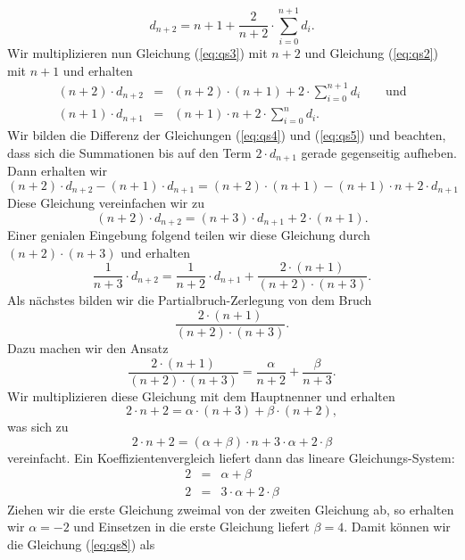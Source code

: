 \begin{equation}
  \label{eq:qs3}
   d_{n+2} = n+1 + \frac{2}{n+2} \cdot \sum_{i=0}^{n+1} d_i.  
\end{equation}
Wir multiplizieren nun Gleichung (\ref{eq:qs3}) mit $n+2$ und Gleichung (\ref{eq:qs2}) mit $n+1$ und
erhalten 
\begin{eqnarray}
  \label{eq:qs4}
 (n+2)\cdot d_{n+2} & = & (n+2)\cdot(n+1) + 2 \cdot \sum_{i=0}^{n+1} d_i \qquad \mbox{und} \\
  \label{eq:qs5}
 (n+1)\cdot d_{n+1} & = & (n+1)\cdot n + 2 \cdot \sum_{i=0}^n d_i.  
\end{eqnarray}
Wir bilden die Differenz der Gleichungen (\ref{eq:qs4}) und (\ref{eq:qs5}) und beachten,
dass sich die Summationen bis auf den Term $2\cdot d_{n+1}$ gerade gegenseitig aufheben.
Dann erhalten wir
\begin{equation}
  \label{eq:qs6}
 (n+2)\cdot d_{n+2} - (n+1)\cdot \displaystyle d_{n+1} = (n+2)\cdot(n+1) - (n+1)\cdot n+2 \cdot d_{n+1}
\end{equation}
Diese Gleichung vereinfachen wir zu
\begin{equation}
  \label{eq:qs7}
(n+2)\cdot d_{n+2} = (n+3)\cdot \displaystyle d_{n+1} + 2\cdot(n+1).  
\end{equation}
Einer genialen Eingebung folgend teilen wir diese Gleichung durch $(n+2) \cdot(n+3)$ und
erhalten 
\begin{equation}
  \label{eq:qs8}
 \frac{1}{n+3} \cdot d_{n+2} = \frac{1}{n+2}\cdot d_{n+1} + \frac{2\cdot(n+1)}{(n+2)\cdot(n+3)}.
\end{equation}
Als n\"achstes bilden wir die Partialbruch-Zerlegung von dem Bruch
\[ \frac{2\cdot(n+1)}{(n+2)\cdot(n+3)}. \] 
Dazu machen wir den Ansatz
\[ \frac{2\cdot(n+1)}{(n+2)\cdot(n+3)} = \frac{\alpha}{n+2} + \frac{\beta}{n+3}.\]
Wir multiplizieren diese Gleichung mit dem Hauptnenner und erhalten
\[ 2\cdot n + 2 = \alpha \cdot (n+3) + \beta \cdot (n+2), \]
was sich zu 
\[ 2\cdot n + 2 = (\alpha + \beta) \cdot n + 3 \cdot \alpha  + 2 \cdot \beta \]
vereinfacht.  Ein Koeffizientenvergleich liefert dann das lineare Gleichungs-System:
\begin{eqnarray*}
  2 & = & \alpha + \beta \\
  2 & = & 3 \cdot \alpha + 2 \cdot \beta 
\end{eqnarray*}
Ziehen wir die erste Gleichung zweimal von der zweiten Gleichung ab, so erhalten wir
 $\alpha = -2$ und Einsetzen in die erste Gleichung liefert $\beta = 4$.
Damit k\"onnen wir die Gleichung (\ref{eq:qs8}) als 
